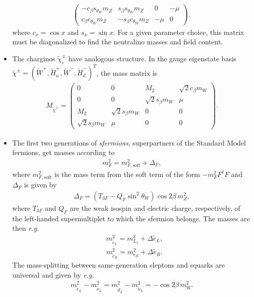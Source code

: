\documentclass[twoside,english]{uiofysmaster}
\begin{document}
\begin{itemize}
\begin{align}
\begin{pmatrix}
 			- c_\beta s_{\theta_W} m_Z &  s_\beta s_{\theta_W} m_Z & 0 & -\mu \\
			 c_\beta c_{\theta_W} m_Z & - s_\beta c_{\theta_W} m_Z & -\mu & 0
 		\end{pmatrix},
 	\end{align}
 	where $c_x = \cos x$ and $s_x = \sin x$. For a given parameter choice, this matrix must be diagonalized to find the neutralino masses and field content.
 	\item The charginos $\tilde\chi_i^\pm$ have analogous structure. In the gauge eigenstate basis $\tilde \chi^{\pm} = (\tilde W^+, \tilde H_u^+, \tilde W^-, \tilde H_d^-)^T$, the mass matrix is
 	\begin{align}
 		M_{\tilde \chi^\pm} = \begin{pmatrix}
 			0 & 0 & M_2 & \sqrt{2} c_\beta m_W  \\
 			0 & 0 & \sqrt{2} s_\beta m_W & \mu \\
 			M_2 & \sqrt{2} s_\beta m_W & 0 & 0\\
 			\sqrt{2} s_\beta m_W & \mu & 0 & 0
 		\end{pmatrix}.
 	\end{align}
 	\item The first two generations of {\it sfermions}, superpartners of the Standard Model fermions, get masses according to
 	\begin{align}
 		m^2_F = m^2_{F,\mathrm{soft}} + \Delta_F,
 	\end{align}
 	where $m^2_{F,\mathrm{soft}}$ is the mass term from the soft term of the form $-m^2_F F^\dag F$ and $\Delta_F$ is given by
 	\begin{align}
 		\Delta_F = (T_{3F} - Q_F \sin^2\theta_W)\cos 2\beta \, m^2_Z,
 	\end{align}
 	where $T_{3F}$ and $Q_F$ are the weak isospin and electric charge, respectively, of the left-handed supermultiplet to which the sfermion belongs. The masses are then {\it e.g.}\
 	\begin{align}
 		&m^2_{\tilde e_L} = m^2_{L_1} + \Delta \tilde e_L,\\
 		&m^2_{\tilde e_R} = m^2_{e_R} + \Delta \tilde e_R.
 	\end{align}
 	The mass-splitting between same-generation sleptons and squarks are universal and given by {\it e.g.}\ %
 	\begin{align}
 		m^2_{\tilde e_L} - m^2_{\tilde \nu_L} = m^2_{\tilde d_L} - m^2_{\tilde u_L} = -\cos 2\beta \, m_W^2.

\end{align}
\end{itemize}
\end{document}
